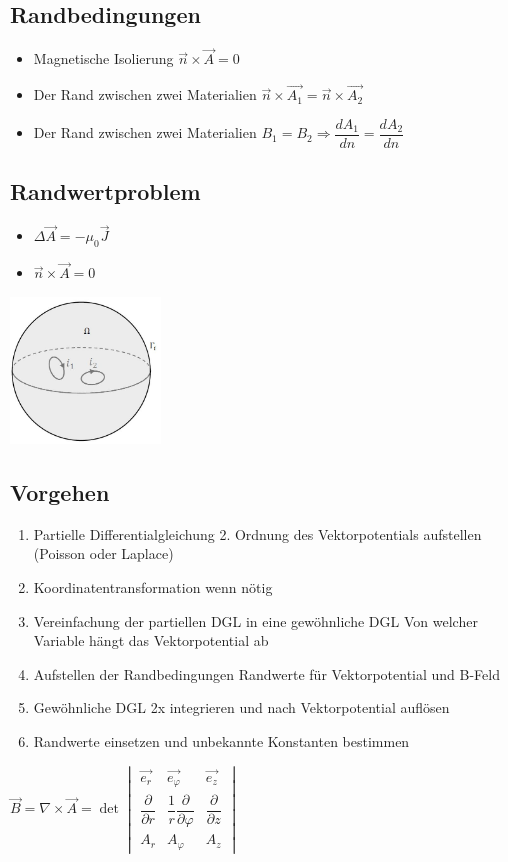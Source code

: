 \subsection{Randbedingungen}
\begin{itemize}
	\item Magnetische Isolierung $\vec{n} \times \vec{A} =0$
	\item Der Rand zwischen zwei Materialien $\vec{n} \times \vec{A_{1}}=\vec{n} \times \vec{A_{2}}$
	\item Der Rand zwischen zwei Materialien $B_{1}=B_{2} \Rightarrow \dfrac{dA_{1}}{d n}=\dfrac{dA_{2}}{d n} $
\end{itemize}
\subsection{Randwertproblem}
\begin{minipage}{8cm}
	\begin{itemize}
		\item $\Delta\vec{A}=-\mu_{0}\vec{J}$
		\item $\vec{n} \times \vec{A} =0$
	\end{itemize}	
\end{minipage}
\begin{minipage}{8cm}
	\includegraphics[width=4cm]{images/Randwertproblem.jpg}
\end{minipage}
\subsection{Vorgehen}
	\begin{enumerate}
		\item Partielle Differentialgleichung 2. Ordnung des Vektorpotentials aufstellen (Poisson oder Laplace)
		\item Koordinatentransformation wenn nötig
		\item Vereinfachung der partiellen DGL in eine gewöhnliche DGL 
		\subitem Von welcher Variable hängt das Vektorpotential ab
		\item Aufstellen der Randbedingungen
		\subitem Randwerte für Vektorpotential und B-Feld
		\item Gewöhnliche DGL 2x integrieren und nach Vektorpotential auflösen
		\item Randwerte einsetzen und unbekannte Konstanten bestimmen
	\end{enumerate}

$\boxed{\vec B=\nabla\times\vec{A} = 
	\det
	\begin{vmatrix}
	\vec{e_r} & \vec{e_{\varphi}}&\vec{e_z}\\
	\dfrac{\partial}{\partial r} & \dfrac{1}{r}\dfrac{\partial}{\partial \varphi}& \dfrac{\partial}{\partial z}\\
	A_r& A_{\varphi} & A_z
	\end{vmatrix}}$
\clearpage
\pagebreak